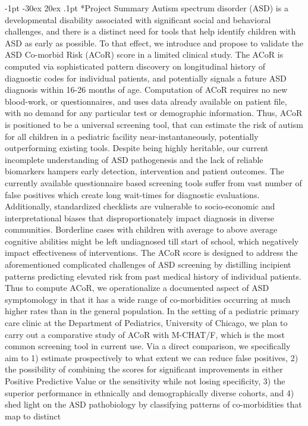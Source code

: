 \documentclass[onecolumn, compsoc,11pt]{IEEEtran}
\makeatletter
\renewcommand\section{\@startsection {section}{1}{\z@}%
                                   {-1pt \@plus -30ex \@minus 20ex}%
                                   {.1pt}%
                                   {\large\bfseries\scshape}}
\def\acor{ACoR\xspace}
\makeatother
\begin{document}


\vspace{20pt}



\section*{Project Summary}
Autism spectrum disorder (ASD) is a developmental disability associated with significant social and behavioral challenges, and there is a distinct need for tools that help identify children with ASD as early as possible. To that effect, we introduce and propose to validate  the ASD Co-morbid Risk (\acor) score in a limited clinical study. The \acor is  computed via sophisticated pattern discovery on longitudinal history of diagnostic codes for individual patients, and potentially signals a future ASD diagnosis within 16-26 months of age. Computation of \acor requires no new blood-work,  or questionnaires, and   uses  data  already available on patient file, with no demand for any particular test or demographic information. Thus, \acor is positioned to be a universal screening tool, that can estimate the risk of autism for all children in a pediatric facility near-instantaneously, potentially outperforming existing tools.  Despite  being  highly heritable,  our  current  incomplete understanding of ASD pathogenesis and the lack of reliable biomarkers hampers early detection, intervention and patient outcomes. The currently available questionnaire based screening tools suffer from vast number of false positives which create long wait-times for diagnostic evaluations. Additionally, standardized checklists are vulnerable  to  socio-economic  and  interpretational  biases  that  disproportionately  impact  diagnosis  in  diverse communities.  Borderline  cases  with  children  with  average  to  above  average  cognitive  abilities  might  be  left undiagnosed till start of school, which negatively impact effectiveness of interventions. The \acor score is designed to   address  the  aforementioned complicated  challenges  of  ASD  screening  by  distilling  incipient    patterns predicting  elevated  risk  from  past medical  history  of  individual  patients. Thus to compute \acor, we operationalize a documented aspect of ASD symptomology in that  it  has  a  wide  range  of  co-morbidities  occurring  at  much  higher  rates  than  in  the  general  population. In  the  setting  of  a  pediatric  primary  care  clinic  at  the  Department  of Pediatrics, University of Chicago, we plan to carry out a comparative study of ACoR with  M-CHAT/F, which is the  most common  screening  tool  in  current  use.  Via  a  direct  comparison,  we  specifically  aim  to  1)  estimate prospectively  to  what  extent  we  can  reduce  false  positives,  2)  the  possibility  of  combining  the  scores  for significant improvements in either Positive Predictive Value or the sensitivity while not losing specificity, 3) the superior  performance  in  ethnically  and  demographically  diverse  cohorts,  and  4)  shed  light  on  the  ASD pathobiology by classifying patterns of co-morbidities that map to  distinct 
\end{document}

